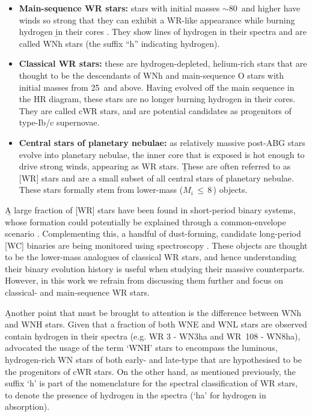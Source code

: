 \begin{itemize}
    \item \textbf{Main-sequence WR stars:} stars with initial masses ${\sim}80\,$\Msun{} and higher have winds so strong that they can exhibit a WR-like appearance while burning hydrogen \b{in their cores \citep{langer_towards_1994,1995Crowtherb_fundamental_WNL,1997deKoter}. They show lines of hydrogen in their spectra and are called WNh stars (the suffix ``h'' indicating hydrogen).}
    \item \textbf{Classical WR stars:} these are hydrogen-depleted, helium-rich stars that are thought to be the descendants of WNh and main-sequence O stars with initial masses from 25\,\Msun{} and above. Having evolved off the main sequence in the HR diagram, these stars are no longer burning hydrogen in their cores. They are called cWR stars, and are potential candidates as progenitors of type-Ib/c supernovae.
    \item \textbf{Central stars of planetary nebulae:} as relatively massive post-ABG stars evolve into planetary nebulae, the inner core that is exposed is hot enough to drive strong winds, appearing as WR stars. \b{These are often referred to as [WR] stars \citep[e.g.][]{1974Webster_Glass_BrWR} and are a small subset of all central stars of planetary nebulae. These stars formally stem from lower-mass ($M_i\,\leq\,8\,$\Msun{}) objects.}
\end{itemize}

\b{A large fraction of [WR] stars have been found in short-period binary systems, whose formation could potentially be explained through a common-envelope scenario \citep{2009Miszalski_BrWR_closebinaries,2011Miszalski_binarity_morphology,2015Jones_CE_WR_binaries}. Complementing this, a handful of dust-forming, candidate long-period [WC] binaries are being monitored using spectroscopy \citep{2015Manick_WR_longperiodRVs,2015Miszalski_WRbinary_postCE}. These objects are thought to be the lower-mass analogues of classical WR stars, and hence understanding their binary evolution history is useful when studying their massive counterparts. However, in this work we refrain from discussing them further and focus on classical- and main-sequence WR stars.}

\b{Another point that must be brought to attention is the difference between WNh and WNH stars. Given that a fraction of both WNE and WNL stars are observed contain hydrogen in their spectra (e.g. WR 3 - WN3ha and WR 108 - WN8ha), \citet{2008smithconti_WNH} advocated the usage of the term `WNH' stars to encompass the luminous, hydrogen-rich WN stars of both early- and late-type that are hypothesised to be the progenitors of cWR stars. On the other hand, as mentioned previously, the suffix `h' is part of the nomenclature for the spectral classification of WR stars, to denote the presence of hydrogen in the spectra (`ha' for hydrogen in absorption). }

